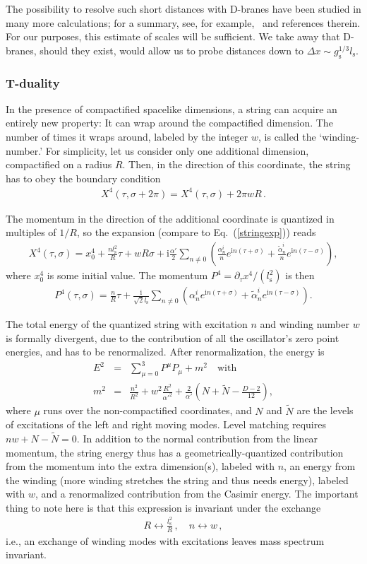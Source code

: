 \documentclass{article}
\def\beqn{\begin{eqnarray}}
\def\eeqn{\end{eqnarray}}
\begin{document}
The possibility
to resolve such short distances with D-branes have been studied in many more calculations; 
for a summary, see, for example,~\cite{Bachas:1998rg} and references therein. For our purposes, this estimate of
scales will be sufficient. We take away that D-branes, should they exist, would allow us to probe distances
down to $\Delta x \sim g_{\mathrm{s}}^{1/3} l_{\mathrm{s}}$. 
 
\subsubsection{T-duality}
\label{tdual}

In the presence of compactified spacelike dimensions, a string can acquire an entirely new property: It can wrap
around the compactified dimension. The number of times it wraps around, labeled by the integer $w$, is called 
the `winding-number.'
For simplicity, let us consider only one additional dimension, compactified on a radius $R$. Then, in the
direction of this coordinate, the string has to obey the boundary condition
\beqn
X^4(\tau, \sigma + 2 \pi) = X^4(\tau,\sigma) + 2 \pi w R \,. 
\eeqn 

The momentum in the direction of the additional coordinate is quantized in multiples of $1/R$, so the expansion (compare to Eq.~(\ref{stringexp})) reads
\beqn
X^4(\tau,\sigma) = x_0^4 + \frac{n l_{\mathrm{s}}^2}{R} \tau + w R \sigma + 
\mathrm{i} \frac{\alpha'}{2} \sum_{n \neq 0} \left( \frac{\alpha^i_n}{n} e^{\mathrm{i}n(\tau+\sigma)} + \frac{\tilde{\alpha}^i_n}{n} e^{\mathrm{i}n (\tau -\sigma)} \right) ,
\eeqn
where $x_0^4$ is some initial value. The momentum $P^4 = \partial_\tau x^4/(l_{\mathrm{s}}^2)$ is then
\beqn
P^4(\tau,\sigma) = \frac{n}{R} \tau + 
\frac{\mathrm{i}}{\sqrt{2} l_{\mathrm{s}}} 
\sum_{n \neq 0} \left( \alpha^i_n e^{\mathrm{i}n(\tau+\sigma)} + \tilde{\alpha}^i_n e^{\mathrm{i}n (\tau -\sigma)} \right) .
\eeqn

The total energy of the quantized string with excitation $n$ and winding number $w$ is formally divergent, due to the contribution of all the oscillator's zero point energies, and has to be renormalized. After renormalization, the energy is
\beqn
E^2 &=& \sum^3_{\mu =0} P^\mu P_{\mu} + m^2 \quad \mbox{with}\\
m^2 &=& \frac{n^2}{R^2} +  w^2 \frac{R^2}{\alpha'^2} + \frac{2}{\alpha'} \left( N + \tilde N - \frac{D-2}{12} \right) , \label{massex}
\eeqn
where $\mu$ runs over the non-compactified coordinates, and $N$ and $\tilde N$ are the levels of excitations of the left and right moving modes. Level
matching requires $nw + N - \tilde N = 0$. In addition to the normal contribution from the linear momentum, the string energy
thus has a geometrically-quantized contribution from the momentum into the extra dimension(s), labeled with $n$, an energy from the winding
(more winding stretches the string and thus needs energy), labeled with $w$, and a renormalized contribution from the Casimir energy. The 
important thing to note here is that this expression is invariant under the exchange
\beqn
R \leftrightarrow \frac{l_{\mathrm{s}}^2}{R} \,,\quad n \leftrightarrow w \,,
\eeqn
i.e., an exchange of winding modes with excitations leaves mass spectrum invariant. 
\end{document}
